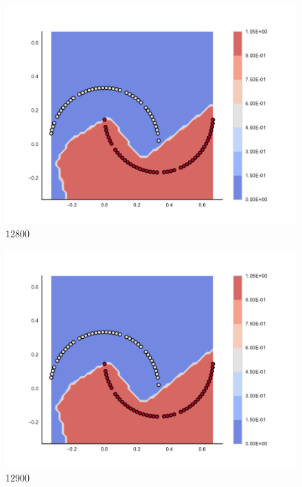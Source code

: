\begin{subfigure}[b]{0.09\textwidth}
    \includegraphics[clip, trim=2.35cm 1.75cm 4.5cm 0cm,width=\textwidth]{img/convergence/12800.pdf}
    \caption{12800}
    \label{fig:convergence_12800}
\end{subfigure}
%
\begin{subfigure}[b]{0.09\textwidth}
    \includegraphics[clip, trim=2.35cm 1.75cm 4.5cm 0cm,width=\textwidth]{img/convergence/12900.pdf}
    \caption{12900}
    \label{fig:convergence_12900}
\end{subfigure}
%
